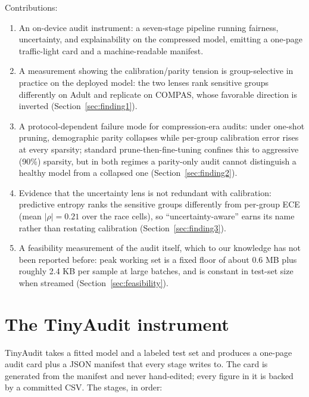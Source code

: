 \documentclass{article}
\begin{document}
Contributions:
\begin{enumerate}
  \item An on-device audit instrument: a seven-stage pipeline running fairness, uncertainty, and explainability on the compressed model, emitting a one-page traffic-light card and a machine-readable manifest.
  \item A measurement showing the calibration/parity tension is group-selective in practice on the deployed model: the two lenses rank sensitive groups differently on Adult and replicate on COMPAS, whose favorable direction is inverted (Section~\ref{sec:finding1}).
  \item A protocol-dependent failure mode for compression-era audits: under one-shot pruning, demographic parity collapses while per-group calibration error rises at every sparsity; standard prune-then-fine-tuning confines this to aggressive (90\%) sparsity, but in both regimes a parity-only audit cannot distinguish a healthy model from a collapsed one (Section~\ref{sec:finding2}).
  \item Evidence that the uncertainty lens is not redundant with calibration: predictive entropy ranks the sensitive groups differently from per-group ECE (mean $|\rho| = 0.21$ over the race cells), so ``uncertainty-aware'' earns its name rather than restating calibration (Section~\ref{sec:finding3}).
  \item A feasibility measurement of the audit itself, which to our knowledge has not been reported before: peak working set is a fixed floor of about 0.6 MB plus roughly 2.4 KB per sample at large batches, and is constant in test-set size when streamed (Section~\ref{sec:feasibility}).
\end{enumerate}

\section{The TinyAudit instrument}

TinyAudit takes a fitted model and a labeled test set and produces a one-page audit card plus a JSON manifest that every stage writes to. The card is generated from the manifest and never hand-edited; every figure in it is backed by a committed CSV. The stages, in order:
\end{document}
